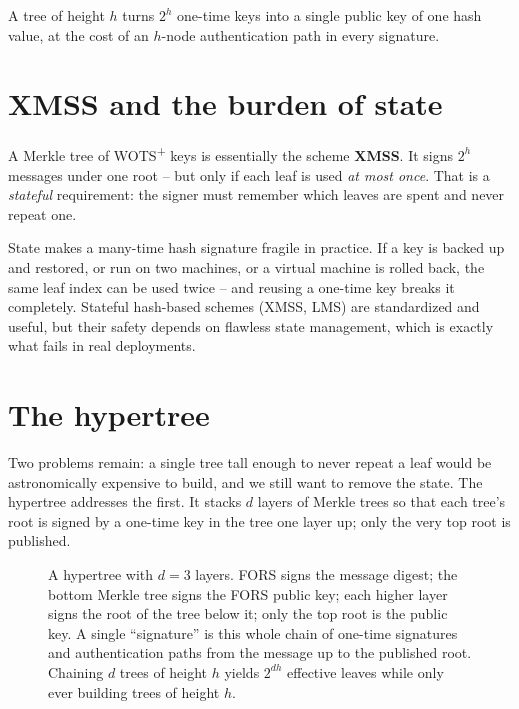 A tree of height $h$ turns $2^h$ one-time keys into a single public key of one hash value, at the cost of an $h$-node authentication path in every signature.

\section{XMSS and the burden of state}
A Merkle tree of WOTS\textsuperscript{+} keys is essentially the scheme \textbf{XMSS}. It signs $2^h$ messages under one root -- but only if each leaf is used \emph{at most once}. That is a \emph{stateful} requirement: the signer must remember which leaves are spent and never repeat one.

\begin{remark}
State makes a many-time hash signature fragile in practice. If a key is backed up and restored, or run on two machines, or a virtual machine is rolled back, the same leaf index can be used twice -- and reusing a one-time key breaks it completely. Stateful hash-based schemes (XMSS, LMS) are standardized and useful, but their safety depends on flawless state management, which is exactly what fails in real deployments.
\end{remark}

\section{The hypertree}
Two problems remain: a single tree tall enough to never repeat a leaf would be astronomically expensive to build, and we still want to remove the state. The hypertree addresses the first. It stacks $d$ layers of Merkle trees so that each tree's root is signed by a one-time key in the tree one layer up; only the very top root is published.

\begin{figure}[H]
\centering
{}
\caption{A hypertree with $d=3$ layers. FORS signs the message digest; the bottom Merkle tree signs the FORS public key; each higher layer signs the root of the tree below it; only the top root is the public key. A single ``signature'' is this whole chain of one-time signatures and authentication paths from the message up to the published root. Chaining $d$ trees of height $h$ yields $2^{dh}$ effective leaves while only ever building trees of height $h$.}
\label{fig:hypertree}
\end{figure}

